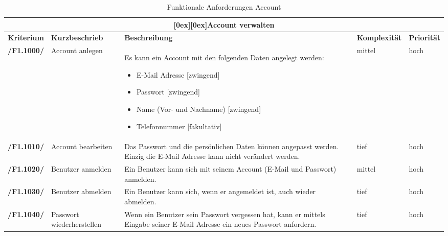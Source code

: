 \documentclass[10pt,a4paper,titlepage,twoside,german,final]{zhawreprt}
\newcommand{\AddRequirement}[2]{
\textbf{/#1#2/}
}
\newcommand{\F}[1]{
\AddRequirement{F1.}{#1}
}
\newcommand{\tableheader}[2]{\multicolumn{#1}{c}{\raisebox{-0.3em}[0ex][0ex]{\large{\textbf{#2}}}}}
\numberwithin{table}{chapter}
\begin{document}
\begin{table}[ht]\centering
\begin{longtable}{l|p{2.5cm}|p{5cm}|p{2cm}|p{1.5cm}}\hline
\tableheader{5}{Account verwalten}\\[0.3em]\hline
\textbf{Kriterium} & \textbf{Kurzbeschrieb} & \textbf{Beschreibung} & \textbf{Komplexität} & \textbf{Priorität}\\\hline
\F{1000} & Account anlegen & Es kann ein Account mit den folgenden Daten angelegt werden:\linebreak
\begin{itemize}
\item E-Mail Adresse [zwingend]
\item Passwort [zwingend]
\item Name (Vor- und Nachname) [zwingend]
\item Telefonnummer [fakultativ]
\end{itemize}
& mittel & hoch\\\hline
\F{1010} & Account bearbeiten & Das Passwort und die persönlichen Daten können angepasst werden. Einzig die E-Mail Adresse kann nicht verändert werden. & tief & hoch\\\hline
\F{1020} & Benutzer anmelden & Ein Benutzer kann sich mit seinem Account (E-Mail und Passwort) anmelden. & mittel & hoch\\\hline
\F{1030} & Benutzer abmelden & Ein Benutzer kann sich, wenn er angemeldet ist, auch wieder abmelden. & tief & hoch\\\hline
\F{1040} & Passwort wiederherstellen & Wenn ein Benutzer sein Passwort vergessen hat, kann er mittels Eingabe seiner E-Mail Adresse ein neues Passwort anfordern. & tief & hoch\\\hline
\end{longtable}
\caption{Funktionale Anforderungen Account}\label{tbl:FuncAccount}
\end{table}
\end{document}
